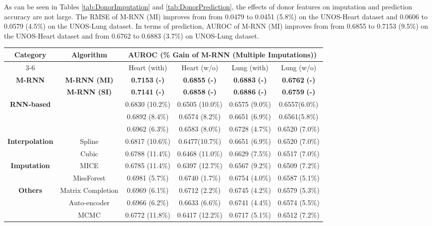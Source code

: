 \documentclass{article}
\begin{document}
As can be seen in  Tables \ref{tab:DonorImputation} and \ref{tab:DonorPrediction}, the effects of donor features on imputation and prediction accuracy are not large.  The RMSE of M-RNN (MI) improves from from 0.0479 to 0.0451  (5.8\%) on the UNOS-Heart dataset and 0.0606 to 0.0579   (4.5\%) on the UNOS-Lung dataset.  In terms of prediction, AUROC of M-RNN (MI) improves from from 0.6855 to 0.7153  (9.5\%) on the  UNOS-Heart dataset and from 0.6762  to 0.6883 (3.7\%) on  UNOS-Lung dataset.   
\begin{table*}[t!]
	\caption{Performance comparison for label prediction (AUROC) with/without donor features in UNOS dataset}
	\label{tab:DonorPrediction}
	\centering
	\small
	\begin{tabular}{c|c|c|c|c|c}
		\toprule
		\multirow{2}{*}{\textbf{Category}} & \multirow{2}{*}{\textbf{Algorithm}}&\multicolumn{4}{c}{\textbf{AUROC (\% Gain of M-RNN (Multiple Imputations))}}  \\
		\cmidrule{3-6}
		& & Heart (with) & Heart (w/o) & Lung (with) & Lung (w/o) \\
		\midrule
		\multirow{2}{*}{\textbf{M-RNN}}&\textbf{M-RNN (MI)} &  \textbf{0.7153}  \textbf{(-)}  &\textbf{0.6855}  \textbf{(-)} & \textbf{0.6883}  \textbf{(-)} & \textbf{0.6762}  \textbf{(-)} \\
		&\textbf{M-RNN (SI)} &  \textbf{0.7141}  \textbf{(-)}  & \textbf{0.6858}  \textbf{(-)} & \textbf{0.6886}  \textbf{(-)} & \textbf{0.6759}  \textbf{(-)}  \\
		\midrule
		\multirow{3}{*}{\textbf{RNN-based}}&\cite{Recent_RNN1} &  0.6830 (10.2\%)& 0.6505  (10.0\%)  & 0.6575 (9.0\%) & 0.6557(6.0\%) \\
		&\cite{Recent_RNN2}   & 0.6892 (8.4\%)& 0.6574 (8.2\%)& 0.6651 (6.9\%) & 0.6561(5.8\%) \\
		&\cite{Recent_RNN3}   &  0.6962 (6.3\%)& 0.6583 (8.0\%)& 0.6728 (4.7\%) &0.6520 (7.0\%) \\
		\midrule
		\multirow{2}{*}{\textbf{Interpolation}}& Spline & 0.6817 (10.6\%)& 0.6477(10.7\%)&0.6651 (6.9\%)& 0.6520 (7.0\%) \\
		& Cubic & 0.6788 (11.4\%) & 0.6468 (11.0\%) &0.6629 (7.5\%) &0.6517 (7.0\%) \\
		\midrule
		\multirow{2}{*}{\textbf{Imputation}}& MICE & 0.6785 (11.4\%)  & 0.6397 (12.7\%) & 0.6567 (9.2\%) & 0.6509 (7.2\%) \\
		& MissForest & 0.6981 (5.7\%)  &0.6740 (1.7\%) &0.6754 (4.0\%) &0.6587 (5.1\%) \\ 
		\midrule
		\multirow{3}{*}{\textbf{Others}} & Matrix Completion   & 0.6969 (6.1\%) &0.6712 (2.2\%) &0.6745 (4.2\%) &0.6579 (5.3\%) \\
		& Auto-encoder  &0.6966 (6.2\%) &0.6633 (6.6\%) &0.6741 (4.4\%) &0.6574 (5.5\%)  \\
		& MCMC  &0.6772 (11.8\%) &0.6417 (12.2\%) &0.6717 (5.1\%) &0.6512 (7.2\%)  \\
		\bottomrule
	\end{tabular}
\end{table*}
\end{document}
